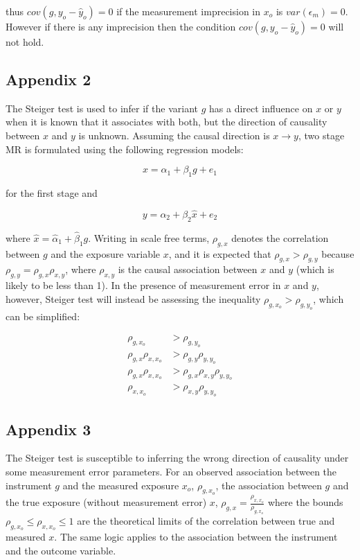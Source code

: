 \documentclass[]{article}
\begin{document}
thus \(cov(g, y_o - \hat{y}_o) = 0\) if the measurement imprecision in
\(x_o\) is \(var(\epsilon_m) = 0\). However if there is any imprecision
then the condition \(cov(g, y_o - \hat{y}_o) = 0\) will not hold.

\newpage

\subsection{Appendix 2}\label{appendix-2}

The Steiger test is used to infer if the variant \(g\) has a direct
influence on \(x\) or \(y\) when it is known that it associates with
both, but the direction of causality between \(x\) and \(y\) is unknown.
Assuming the causal direction is \(x \to y\), two stage MR is formulated
using the following regression models:

\[
x = \alpha_1 + \beta_1 g + e_1
\]

for the first stage and

\[
y = \alpha_2 + \beta_2 \hat{x} + e_2
\]

where \(\hat{x} = \hat{\alpha}_1 + \hat{\beta}_1 g\). Writing in scale
free terms, \(\rho_{g, x}\) denotes the correlation between \(g\) and
the exposure variable \(x\), and it is expected that
\(\rho_{g, x} > \rho_{g, y}\) because
\(\rho_{g, y} = \rho_{g, x}\rho_{x, y}\), where \(\rho_{x, y}\) is the
causal association between \(x\) and \(y\) (which is likely to be less
than 1). In the presence of measurement error in \(x\) and \(y\),
however, Steiger test will instead be assessing the inequality
\(\rho_{g, x_o} > \rho_{g, y_o}\), which can be simplified:

\[
\begin{aligned}
\rho_{g, x_o} & > \rho_{g, y_o} \\
\rho_{g, x} \rho_{x, x_o} & > \rho_{g,y}\rho_{y,y_o}\\
\rho_{g, x} \rho_{x, x_o} & > \rho_{g,x}\rho_{x,y}\rho_{y,y_o}\\
\rho_{x, x_o} & > \rho_{x,y}\rho_{y,y_o}
\end{aligned}
\]

\newpage

\subsection{Appendix 3}\label{appendix-3}

The Steiger test is susceptible to inferring the wrong direction of
causality under some measurement error parameters. For an observed
association between the instrument \(g\) and the measured exposure
\(x_o\), \(\rho_{g,x_o}\), the association between \(g\) and the true
exposure (without measurement error) \(x\),
\(\rho_{g,x} = \frac{\rho_{x,x_o}}{\rho_{g,x_o}}\) where the bounds
\(\rho_{g,x_o} \leq \rho_{x,x_o} \leq 1\) are the theoretical limits of
the correlation between true and measured \(x\). The same logic applies
to the association between the instrument and the outcome variable.
\end{document}

